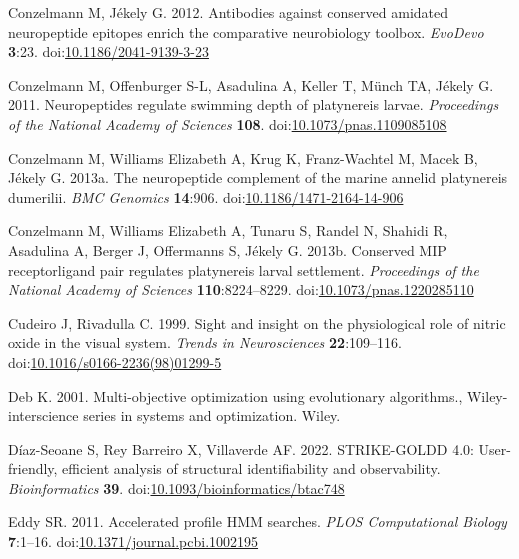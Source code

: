 \documentclass[
  11pt,
  letterpaper,
  DIV=11,
  numbers=noendperiod]{scrartcl}
\newlength{\cslhangindent}
\newenvironment{CSLReferences}[2] %
 {\begin{list}{}{%
  \setlength{\itemindent}{0pt}
  \setlength{\leftmargin}{0pt}
  \setlength{\parsep}{0pt}
  \ifodd #1
   \setlength{\leftmargin}{\cslhangindent}
   \setlength{\itemindent}{-1\cslhangindent}
  \fi
  \setlength{\itemsep}{#2\baselineskip}}}
 {\end{list}}
\begin{document}
\begin{CSLReferences}{1}{0}
Conzelmann M, Jékely G. 2012. Antibodies against conserved amidated
neuropeptide epitopes enrich the comparative neurobiology toolbox.
\emph{EvoDevo} \textbf{3}:23.
doi:\href{https://doi.org/10.1186/2041-9139-3-23}{10.1186/2041-9139-3-23}

Conzelmann M, Offenburger S-L, Asadulina A, Keller T, Münch TA, Jékely
G. 2011. Neuropeptides regulate swimming depth of platynereis larvae.
\emph{Proceedings of the National Academy of Sciences} \textbf{108}.
doi:\href{https://doi.org/10.1073/pnas.1109085108}{10.1073/pnas.1109085108}

Conzelmann M, Williams Elizabeth A, Krug K, Franz-Wachtel M, Macek B,
Jékely G. 2013a. The neuropeptide complement of the marine annelid
platynereis dumerilii. \emph{BMC Genomics} \textbf{14}:906.
doi:\href{https://doi.org/10.1186/1471-2164-14-906}{10.1186/1471-2164-14-906}

Conzelmann M, Williams Elizabeth A, Tunaru S, Randel N, Shahidi R,
Asadulina A, Berger J, Offermanns S, Jékely G. 2013b. Conserved MIP
receptor{\textendash}ligand pair regulates platynereis larval
settlement. \emph{Proceedings of the National Academy of Sciences}
\textbf{110}:8224--8229.
doi:\href{https://doi.org/10.1073/pnas.1220285110}{10.1073/pnas.1220285110}

Cudeiro J, Rivadulla C. 1999. Sight and insight {\textendash} on the
physiological role of nitric oxide in the visual system. \emph{Trends in
Neurosciences} \textbf{22}:109--116.
doi:\href{https://doi.org/10.1016/s0166-2236(98)01299-5}{10.1016/s0166-2236(98)01299-5}

Deb K. 2001. Multi-objective optimization using evolutionary
algorithms., Wiley-interscience series in systems and optimization.
Wiley.

Díaz-Seoane S, Rey Barreiro X, Villaverde AF. 2022. STRIKE-GOLDD 4.0:
User-friendly, efficient analysis of structural identifiability and
observability. \emph{Bioinformatics} \textbf{39}.
doi:\href{https://doi.org/10.1093/bioinformatics/btac748}{10.1093/bioinformatics/btac748}

Eddy SR. 2011. Accelerated profile HMM searches. \emph{PLOS
Computational Biology} \textbf{7}:1--16.
doi:\href{https://doi.org/10.1371/journal.pcbi.1002195}{10.1371/journal.pcbi.1002195}


\end{CSLReferences}
\end{document}
